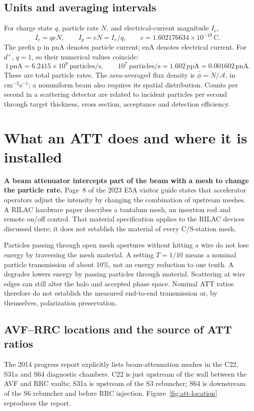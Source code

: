 \documentclass[11pt,a4paper]{article}
\begin{document}
\subsection{Units and averaging intervals}
For charge state $q$, particle rate $\dot N$, and electrical-current magnitude $I_e$,
\[
I_e=q e\dot N,\qquad I_p=e\dot N=I_e/q,
\qquad e=1.602176634\times10^{-19}\,\mathrm C.
\]
The prefix p in $\mathrm{pnA}$ denotes particle current; $\mathrm{enA}$ denotes electrical current. For $d^+$, $q=1$, so their numerical values coincide:
\[
1\,\mathrm{pnA}=6.2415\times10^9\ \text{particles/s},\qquad
10^7\ \text{particles/s}=1.602\,\mathrm{ppA}=0.001602\,\mathrm{pnA}.
\]
These are total particle rates. The area-averaged flux density is $\bar\phi=\dot N/\mathcal A$, in $\mathrm{cm^{-2}s^{-1}}$; a nonuniform beam also requires its spatial distribution. Counts per second in a scattering detector are related to incident particles per second through target thickness, cross section, acceptance and detection efficiency.

\section{What an ATT does and where it is installed}
\label{sec:att}
\textbf{A beam attenuator intercepts part of the beam with a mesh to change the particle rate.} Page~8 of the 2023 E5A visitor guide states that accelerator operators adjust the intensity by changing the combination of upstream meshes.\cite{e5a} A RILAC hardware paper describes a tantalum mesh, an insertion rod and remote on/off control. That material specification applies to the RILAC devices discussed there; it does not establish the material of every C/S-station mesh.\cite{att-hardware}

Particles passing through open mesh apertures without hitting a wire do not lose energy by traversing the mesh material. A setting $T=1/10$ means a nominal particle transmission of about 10\%, not an energy reduction to one tenth. A degrader lowers energy by passing particles through material. Scattering at wire edges can still alter the halo and accepted phase space. Nominal ATT ratios therefore do not establish the measured end-to-end transmission or, by themselves, polarization preservation.

\subsection{AVF--RRC locations and the source of ATT ratios}
The 2014 progress report explicitly lists beam-attenuation meshes in the C22, S31a and S64 diagnostic chambers. C22 is just upstream of the wall between the AVF and RRC vaults; S31a is upstream of the S3 rebuncher; S64 is downstream of the S6 rebuncher and before RRC injection. Figure~\ref{fig:att-location} reproduces the report.\cite{att-chambers}
\end{document}
